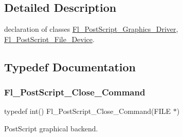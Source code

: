 \subsection{Detailed Description}
declaration of classes \hyperlink{class_fl___post_script___graphics___driver}{Fl\+\_\+\+Post\+Script\+\_\+\+Graphics\+\_\+\+Driver}, \hyperlink{class_fl___post_script___file___device}{Fl\+\_\+\+Post\+Script\+\_\+\+File\+\_\+\+Device}. 



\subsection{Typedef Documentation}
\mbox{\label{_fl___post_script_8_h_ab7cbc3517e5261c856e1030514358fe7}} 
\subsubsection{\texorpdfstring{Fl\+\_\+\+Post\+Script\+\_\+\+Close\+\_\+\+Command}{Fl\_PostScript\_Close\_Command}}
{\footnotesize\ttfamily typedef int() Fl\+\_\+\+Post\+Script\+\_\+\+Close\+\_\+\+Command(F\+I\+LE $\ast$)}



Post\+Script graphical backend. 

